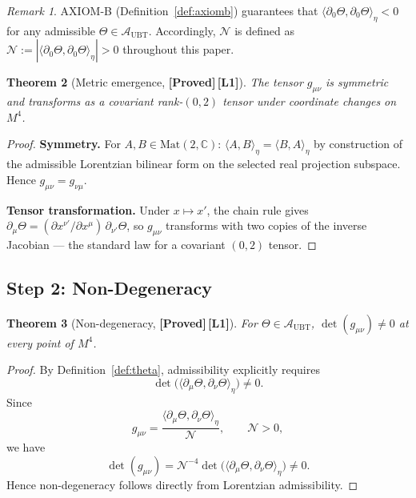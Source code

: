 \documentclass[12pt,a4paper]{article}
\newtheorem{theorem}{Theorem}[section]
\theoremstyle{definition}
\theoremstyle{remark}
\newtheorem{remark}[theorem]{Remark}
\newcommand{\PROVED}{\textbf{[Proved]}}
\newcommand{\Lone}{\textbf{[L1]}}
\newcommand{\CC}{\mathbb{C}}
\newcommand{\calA}{\mathcal{A}}
\newcommand{\calN}{\mathcal{N}}
\begin{document}
\begin{remark}
AXIOM-B (Definition~\ref{def:axiomb}) guarantees that
$\langle \partial_0\Theta,\partial_0\Theta\rangle_\eta < 0$
for any admissible $\Theta \in \calA_{\mathrm{UBT}}$.
Accordingly, $\calN$ is defined as
$\calN := \left|\langle \partial_0\Theta,\partial_0\Theta\rangle_\eta\right| > 0$
throughout this paper.
\end{remark}

\begin{theorem}[Metric emergence, \PROVED\,\Lone]
\label{thm:metric}
The tensor $g_{\mu\nu}$ is symmetric and transforms as a covariant
rank-$(0,2)$ tensor under coordinate changes on $M^4$.
\end{theorem}

\begin{proof}
\textbf{Symmetry.}
For $A,B \in \mathrm{Mat}(2,\CC)$:
$\langle A,B\rangle_\eta = \langle B,A\rangle_\eta$ by construction of the admissible
Lorentzian bilinear form on the selected real projection subspace.
Hence $g_{\mu\nu} = g_{\nu\mu}$.

\textbf{Tensor transformation.}
Under $x \mapsto x'$, the chain rule gives
$\partial_\mu\Theta = (\partial x^{\nu'}/\partial x^\mu)\,\partial_{\nu'}\Theta$,
so $g_{\mu\nu}$ transforms with two copies of the inverse Jacobian ---
the standard law for a covariant $(0,2)$ tensor.
\end{proof}

\subsection{Step 2: Non-Degeneracy}
\label{sec:step2}

\begin{theorem}[Non-degeneracy, \PROVED\,\Lone]
\label{thm:nondeg}
For $\Theta \in \calA_{\mathrm{UBT}}$,
$\det(g_{\mu\nu}) \neq 0$ at every point of $M^4$.
\end{theorem}

\begin{proof}
By Definition~\ref{def:theta}, admissibility explicitly requires
\[
  \det\!\big(\langle\partial_\mu\Theta,\partial_\nu\Theta\rangle_\eta\big)\neq 0.
\]
Since
\[
  g_{\mu\nu}
  = \frac{\langle\partial_\mu\Theta,\partial_\nu\Theta\rangle_\eta}{\calN},
  \qquad \calN>0,
\]
we have
\[
  \det(g_{\mu\nu})
  = \calN^{-4}\det\!\big(\langle\partial_\mu\Theta,\partial_\nu\Theta\rangle_\eta\big)\neq 0.
\]
Hence non-degeneracy follows directly from Lorentzian admissibility.
\end{proof}
\end{document}
